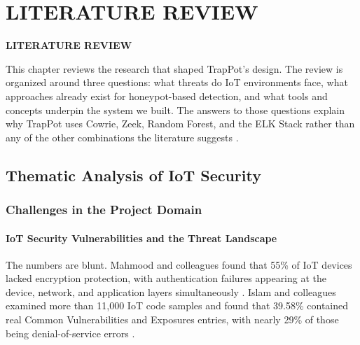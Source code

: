 \chapter{LITERATURE REVIEW}
\pagebreak

\begin{center}
{\LARGE\textbf{LITERATURE REVIEW}}
\end{center}


This chapter reviews the research that shaped TrapPot's design. The review is organized around three questions: what threats do IoT environments face, what approaches already exist for honeypot-based detection, and what tools and concepts underpin the system we built. The answers to those questions explain why TrapPot uses Cowrie, Zeek, Random Forest, and the ELK Stack rather than any of the other combinations the literature suggests \cite{franco2021survey,rodriguezgomez2025systematic,lanz2025optimizing}.

\section{Thematic Analysis of IoT Security}
\label{sec:first_possible_outline}

\subsection{Challenges in the Project Domain}
\label{sub:challenges_in_project_domain}

\subsubsection{IoT Security Vulnerabilities and the Threat Landscape}
\label{subsub:iot_vulnerabilities}

The numbers are blunt. Mahmood and colleagues found that 55\% of IoT devices lacked encryption protection, with authentication failures appearing at the device, network, and application layers simultaneously \cite{mahmood2024exploring}. Islam and colleagues examined more than 11,000 IoT code samples and found that 39.58\% contained real Common Vulnerabilities and Exposures entries, with nearly 29\% of those being denial-of-service errors \cite{islam2023large}.

